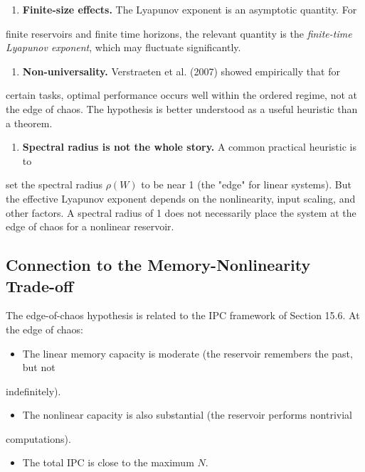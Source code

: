 \begin{enumerate}[nosep]
  \item \textbf{Finite-size effects.} The Lyapunov exponent is an asymptotic quantity. For
\end{enumerate}
   finite reservoirs and finite time horizons, the relevant quantity is the
   \textit{finite-time Lyapunov exponent}, which may fluctuate significantly.

\begin{enumerate}[nosep]
  \item \textbf{Non-universality.} Verstraeten et al. (2007) showed empirically that for
\end{enumerate}
   certain tasks, optimal performance occurs well within the ordered regime, not
   at the edge of chaos. The hypothesis is better understood as a useful heuristic
   than a theorem.

\begin{enumerate}[nosep]
  \item \textbf{Spectral radius is not the whole story.} A common practical heuristic is to
\end{enumerate}
   set the spectral radius $\rho(W)$ to be near 1 (the "edge" for linear systems).
   But the effective Lyapunov exponent depends on the nonlinearity, input scaling,
   and other factors. A spectral radius of 1 does not necessarily place the system
   at the edge of chaos for a nonlinear reservoir.

\subsection{Connection to the Memory-Nonlinearity Trade-off}\label{sec:15.7.5}

The edge-of-chaos hypothesis is related to the IPC framework of Section 15.6. At the
edge of chaos:

\begin{itemize}[nosep]
  \item The linear memory capacity is moderate (the reservoir remembers the past, but not
\end{itemize}
  indefinitely).
\begin{itemize}[nosep]
  \item The nonlinear capacity is also substantial (the reservoir performs nontrivial
\end{itemize}
  computations).
\begin{itemize}[nosep]
  \item The total IPC is close to the maximum $N$.
\end{itemize}

